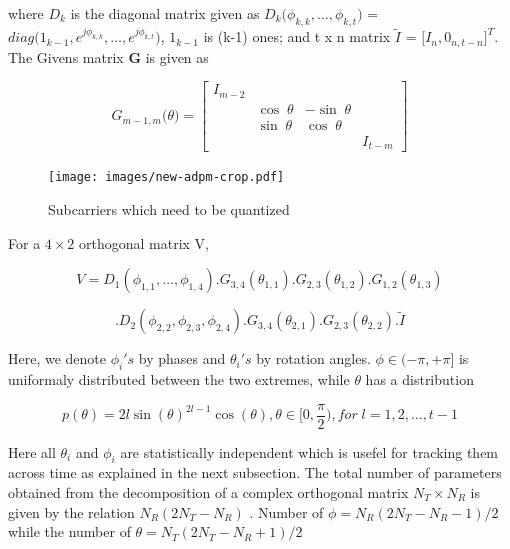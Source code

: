 \documentclass[conference]{IEEEtran}
\begin{document}
where $D_{k}$ is the diagonal matrix given as $D_{k}\big(\phi_{k,k}, \ldots, \phi_{k,t} \big)$ =  $diag\big( 1_{k-1}, e^{j\phi_{k,k}},\ldots, e^{j\phi_{k,t}}  \big)$, $1_{k-1}$ is (k-1) ones; and t x n matrix $\tilde{I}$ = $\big[I_{n}, 0_{n,t-n}\big]^{T}$. The Givens matrix \textbf{G} is given as 

\begin{equation} 
G_{m-1,m}\big(\theta\big)  = 
\begin{bmatrix}

I_{m-2} & & & \\ 
& \cos\;\theta & - \sin\;\theta & \\ 
& \sin\;\theta & \cos\;\theta & \\ 
& & & I_{t-m}

\end{bmatrix} 
\end{equation} 
  

\begin{figure}
\label{adpm-fig}
\texttt{[image: images/new-adpm-crop.pdf]} 
\caption{Subcarriers which need to be quantized} 
\label{ber_overvie}
\vspace{-5pt} 
\end{figure} 


For a $4 \times 2$ orthogonal matrix V, 

$$V = D_{1}(\phi_{1,1},\ldots,\phi_{1,4}).G_{3,4}(\theta_{1,1}) .G_{2,3}(\theta_{1,2}) .G_{1,2}(\theta_{1,3})$$ 

\vspace{-1.4em} 

\hspace{1pt}$$.D_{2}(\phi_{2,2},\phi_{2,3},\phi_{2,4}) .G_{3,4}(\theta_{2,1}) .G_{2,3}(\theta_{2,2}).\tilde{I}$$ 

  

Here, we denote $\phi_{i}'s$ by phases and $\theta_{i}'s$ by rotation angles. $\phi \in (-\pi, + \pi]$ is uniformaly distributed between the two extremes\cite{4114278}, while $\theta$ has a distribution 

\begin{equation} 
p(\theta) = 2l\sin(\theta)^{2l-1}\cos(\theta), \theta \in [0, \frac{\pi}{2}), for \; l = 1,2,\ldots,t-1
\end{equation}

Here all $\theta_i$ and $\phi_i$ are statistically independent which is usefel for tracking them across time as explained in the next subsection. The total number of parameters obtained from the decomposition of a complex orthogonal matrix $N_{T} \times N_{R} $ is given by the relation $N_{R}(2N_{T} - N_{R}) $ \cite{4114278}. Number of $\phi = N_{R}(2N_{T} - N_{R}-1)/2$ while the number of $\theta = N_{T}(2N_{T} - N_{R}+1)/2$ 
\end{document}
